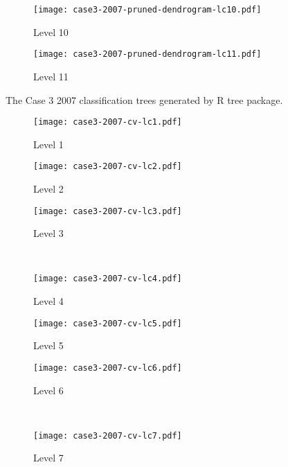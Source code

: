 \begin{appendices}
\begin{figure}[!ht]
\begin{subfigure}[t]{0.32\textwidth}
		\texttt{[image: case3-2007-pruned-dendrogram-lc10.pdf]}
		\caption{Level 10}
	\end{subfigure}
	\begin{subfigure}[t]{0.32\textwidth}
		\texttt{[image: case3-2007-pruned-dendrogram-lc11.pdf]}
		\caption{Level 11}
	\end{subfigure}
	\vspace{5pt}
	\caption[The Case 3 2007 classification trees generated by R tree package.]{The Case 3 2007 classification trees generated by R tree package.}
	\label{fig: appendix-fig.c17.tree}
\end{figure}

\begin{figure}[!ht] \centering
	\captionsetup[subfigure]{width=2.0in}
	\begin{subfigure}[t]{0.32\textwidth}
		\texttt{[image: case3-2007-cv-lc1.pdf]}
		\caption{Level 1}
	\end{subfigure}
	\begin{subfigure}[t]{0.32\textwidth}
		\texttt{[image: case3-2007-cv-lc2.pdf]}
		\caption{Level 2}
	\end{subfigure}
	\begin{subfigure}[t]{0.32\textwidth}
		\texttt{[image: case3-2007-cv-lc3.pdf]}
		\caption{Level 3}
	\end{subfigure}\\
	\vspace{5pt}
	\begin{subfigure}[t]{0.32\textwidth}
		\texttt{[image: case3-2007-cv-lc4.pdf]}
		\caption{Level 4}
	\end{subfigure}
	\begin{subfigure}[t]{0.32\textwidth}
		\texttt{[image: case3-2007-cv-lc5.pdf]}
		\caption{Level 5}
	\end{subfigure}
	\begin{subfigure}[t]{0.32\textwidth}
		\texttt{[image: case3-2007-cv-lc6.pdf]}
		\caption{Level 6}
	\end{subfigure}\\
	\vspace{5pt}	
	\begin{subfigure}[t]{0.32\textwidth}
		\texttt{[image: case3-2007-cv-lc7.pdf]}
		\caption{Level 7}
	\end{subfigure}
	\begin{subfigure}[t]{0.32\textwidth}

\end{subfigure}
\end{figure}
\end{appendices}
